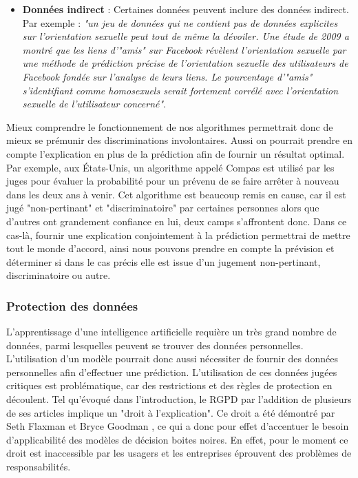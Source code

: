 \begin{itemize}
    \item \textbf{Données indirect} : Certaines données peuvent inclure des données indirect. Par exemple : \textit{"un jeu de données qui ne contient pas de données explicites sur l’orientation sexuelle peut tout de même la dévoiler. Une étude de 2009 a montré que les liens d’"amis" sur Facebook révèlent l’orientation sexuelle par une méthode de prédiction précise de l’orientation sexuelle des utilisateurs de Facebook fondée sur l’analyse de leurs liens. Le pourcentage d’"amis" s’identifiant comme homosexuels serait fortement corrélé avec l’orientation sexuelle de l’utilisateur concerné"}\cite{dicriminationAlgo}.
\end{itemize}
Mieux comprendre le fonctionnement de nos algorithmes permettrait donc de mieux se prémunir des discriminations involontaires. Aussi on pourrait prendre en compte l'explication en plus de la prédiction afin de fournir un résultat optimal. Par exemple, aux États-Unis, un algorithme appelé Compas est utilisé par les juges pour évaluer la probabilité pour un prévenu de se faire arrêter à nouveau dans les deux ans à venir. Cet algorithme est beaucoup remis en cause, car il est jugé "non-pertinant" et "discriminatoire" par certaines personnes alors que d'autres ont grandement confiance en lui, deux camps s'affrontent donc. Dans ce cas-là, fournir une explication conjointement à la prédiction permettrai de mettre tout le monde d'accord, ainsi nous pouvons prendre en compte la prévision et déterminer si dans le cas précis elle est issue d'un jugement non-pertinant, discriminatoire ou autre.
\subsubsection{Protection des données}
L'apprentissage d'une intelligence artificielle requière un très grand nombre de données, parmi lesquelles peuvent se trouver des données personnelles. L'utilisation d'un modèle pourrait donc aussi nécessiter de fournir des données personnelles afin d'effectuer une prédiction. L'utilisation de ces données jugées critiques est problématique, car des restrictions et des règles de protection en découlent. Tel qu'évoqué dans l'introduction, le RGPD par l'addition de plusieurs de ses articles implique un "droit à l'explication". Ce droit a été démontré par Seth Flaxman et Bryce Goodman \cite{RGPDexplanRight}, ce qui a donc pour effet d'accentuer le besoin d'applicabilité des modèles de décision boites noires. En effet, pour le moment ce droit est inaccessible par les usagers et les entreprises éprouvent des problèmes de responsabilités.

